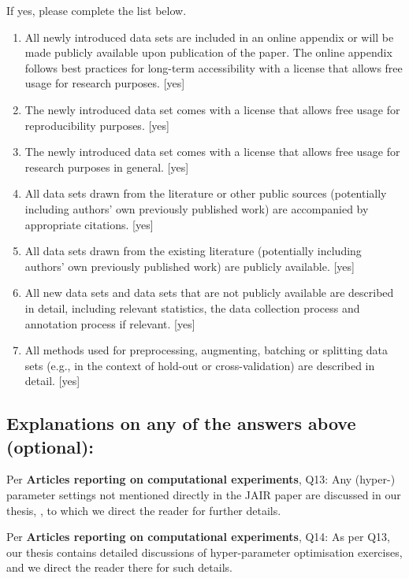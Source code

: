 \documentclass[]{jair}
\begin{document}
If yes, please complete the list below.
\begin{enumerate}
    \item 
    All newly introduced data sets 
    are included in an online appendix 
    or will be made publicly available upon publication of the paper.
    The online appendix follows best practices for long-term accessibility with a license
    that allows free usage for research purposes.
    [yes]
    \item The newly introduced data set comes with a license that
    allows free usage for reproducibility purposes.
    [yes]
    \item The newly introduced data set comes with a license that
    allows free usage for research purposes in general.
    [yes]
    \item All data sets drawn from the literature or other public sources (potentially including authors' own previously published work) are accompanied by appropriate citations.
    [yes]
    \item All data sets drawn from the existing literature (potentially including authors’ own previously published work) are publicly available. [yes]
    \item All new data sets and data sets that are not publicly available are described in detail, including relevant statistics, the data collection process and annotation process if relevant.
    [yes]
    \item 
    All methods used for preprocessing, augmenting, batching or splitting data sets (e.g., in the context of hold-out or cross-validation)
    are described in detail. [yes]
\end{enumerate}

\subsection*{Explanations on any of the answers above (optional):}

Per \textbf{Articles reporting on computational experiments}, Q13: Any (hyper-) parameter settings not mentioned directly in the JAIR paper are discussed in our thesis, \citet{HerronThesis2025}, to which we direct the reader for further details.

Per \textbf{Articles reporting on computational experiments}, Q14: As per Q13, our thesis contains detailed discussions of hyper-parameter optimisation exercises, and we direct the reader there for such details. 
\end{document}
